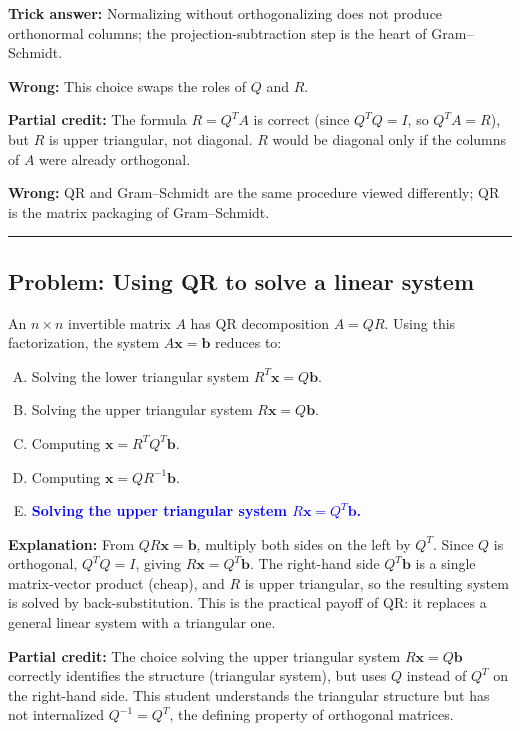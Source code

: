 \documentclass[12pt]{amsart}
\newcommand{\divider}{
  \vspace{-1em}
  \noindent
  \raisebox{-0.15ex}{\textbullet}%
  \hspace{0.5em}%
  \rule[0.5ex]{0.95\textwidth}{1.0pt}%
  \hspace{0.5em}%
  \raisebox{-0.15ex}{\textbullet}%
  \vspace{0em}
}
\begin{document}
\textbf{Trick answer:}
Normalizing without orthogonalizing does not produce orthonormal columns; the
projection-subtraction step is the heart of Gram--Schmidt.

\textbf{Wrong:}
This choice swaps the roles of $Q$ and $R$.

\textbf{Partial credit:}
The formula $R = Q^T A$ is correct (since $Q^T Q = I$, so $Q^T A = R$), but $R$
is upper triangular, not diagonal.
$R$ would be diagonal only if the columns of $A$ were already orthogonal.

\textbf{Wrong:}
QR and Gram--Schmidt are the same procedure viewed differently; QR is the
matrix packaging of Gram--Schmidt.

\divider

\subsection*{Problem: Using QR to solve a linear system}

An $n\times n$ invertible matrix $A$ has QR decomposition $A = QR$.
Using this factorization, the system $A\mathbf{x} = \mathbf{b}$ reduces to:

\begin{enumerate}[(A)]
\item Solving the lower triangular system $R^T\mathbf{x} = Q\mathbf{b}$.
\item Solving the upper triangular system $R\mathbf{x} = Q\mathbf{b}$.
\item Computing $\mathbf{x} = R^T Q^T \mathbf{b}$.
\item Computing $\mathbf{x} = QR^{-1}\mathbf{b}$.
\item \textcolor{blue}{\textbf{Solving the upper triangular system $R\mathbf{x} = Q^T\mathbf{b}$.}}
\end{enumerate}

\textbf{Explanation:}
From $QR\mathbf{x} = \mathbf{b}$, multiply both sides on the left by $Q^T$.
Since $Q$ is orthogonal, $Q^T Q = I$, giving $R\mathbf{x} = Q^T\mathbf{b}$.
The right-hand side $Q^T\mathbf{b}$ is a single matrix-vector product (cheap),
and $R$ is upper triangular, so the resulting system is solved by
back-substitution.
This is the practical payoff of QR: it replaces a general linear system with a
triangular one.

\textbf{Partial credit:}
The choice solving the upper triangular system $R\mathbf{x} = Q\mathbf{b}$ correctly
identifies the structure (triangular system), but uses $Q$ instead of $Q^T$ on
the right-hand side.
This student understands the triangular structure but has not internalized
$Q^{-1} = Q^T$, the defining property of orthogonal matrices.
\end{document}
